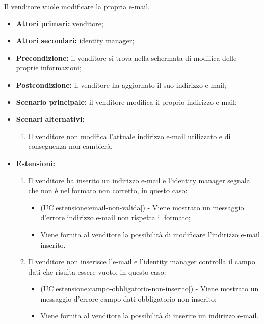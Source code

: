 Il venditore vuole modificare la propria e-mail.
\begin{itemize}
    \item \textbf{Attori primari:} venditore;
    \item \textbf{Attori secondari:} identity manager;
    \item \textbf{Precondizione:} il venditore si trova nella schermata di modifica delle proprie informazioni;
    \item \textbf{Postcondizione:} il venditore ha aggiornato il suo indirizzo e-mail;
    \item \textbf{Scenario principale:} il venditore modifica il proprio indirizzo e-mail;
    \item \textbf{Scenari alternativi:}
    \begin{enumerate}[label=\lett]
    	\item Il venditore non modifica l'attuale indirizzo e-mail utilizzato e di conseguenza non cambierà.
    \end{enumerate}
    \item \textbf{Estensioni:}
    \begin{enumerate}[label=\lett]
    	\item Il venditore ha inserito un indirizzo e-mail e l'identity manager segnala che non è nel formato non corretto, in questo caso:
    	\begin{itemize}
    		\item (UC\ref{estensione:email-non-valida}) - Viene mostrato un messaggio d'errore indirizzo e-mail non rispetta il formato;
    		\item Viene fornita al venditore la possibilità di modificare l'indirizzo e-mail inserito.
    	\end{itemize}
	    \item Il venditore non inserisce l'e-mail e l'identity manager controlla il campo dati che risulta essere vuoto, in questo caso:
	    \begin{itemize}
	    	\item (UC\ref{estensione:campo-obbligatorio-non-inserito}) - Viene mostrato un messaggio d'errore campo dati obbligatorio non inserito;
	    	\item Viene fornita al venditore la possibilità di inserire un indirizzo e-mail.
	    \end{itemize}
    \end{enumerate} 
\end{itemize}


